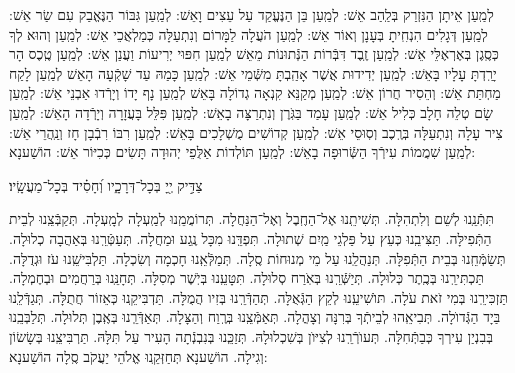 \documentclass[twoside, openany, parskip=half, 11pt]{book}
\begin{document}
לְמַֽעַן אֵיתָן הַנִּזְרַק בְּלַֽהַב אֵשׁ: לְמַֽעַן בֵּן הַנֶּעֱקַד עַל עֵצִים וָאֵשׁ: לְמַֽעַן גִּבּוֹר הַנֶּאֱבַק עִם שַׂר אֵשׁ: לְמַֽעַן דְּגָלִים הִנְחִֽיתָ בְּעָנָן וְאוֹר אֵשׁ: לְמַֽעַן הֹעֲלָה לַמָּרוֹם וְנִתְעַלָּה כְּמַלְאֲכֵי אֵשׁ: לְמַֽעַן וְהוּא לְךָ כְּסֶֽגֶן בְּאֶרְאֶלֵּי אֵשׁ: לְמַֽעַן זֶֽבֶד דִּבְּֿרוֹת הַנְּֿתוּנוֹת מֵאֵשׁ לְמַֽעַן חִפּוּי יְרִיעוֹת וַעֲנַן אֵשׁ: לְמַֽעַן טֶֽכֶס הָר יָרַֽדְתָּ עָלָיו בָּאֵשׁ: לְמַֽעַן יְדִידוּת אֲשֶׁר אָהַֽבְתָּ מִשְּֿׁמֵי אֵשׁ: לְמַֽעַן כָּמַהּ עַד שָׁקְֿעָה הָאֵשׁ לְמַֽעַן לָקַח מַחְתַּת אֵשׁ: וְהֵסִיר חֲרוֹן אֵשׁ: לְמַֽעַן מְקַנֵּא קִנְאָה גְדוֹלָה בָּאֵשׁ לְמַֽעַן נָף יָדוֹ וְיָרְֿדוּ אַבְנֵי אֵשׁ: לְמַֽעַן שָׂם טְלֵה חָלָב כְּלִיל אֵשׁ: לְמַֽעַן עָמַד בַּגֹּֽרֶן וְנִתְרַצָּה בָאֵשׁ: לְמַֽעַן פִּלֵּל בָּעֲזָרָה וְיָרְֿדָה הָאֵשׁ: לְמַֽעַן צִיר עָלָה וְנִתְעַלָּה בְּרֶֽכֶב וְסֽוּסֵי אֵשׁ: לְמַֽעַן קְדוֹשִׁים מֻשְׁלָכִים בָּאֵשׁ: לְמַֽעַן רִבּוֹ רִבְֿבָן חָז וְנַֽהֲרֵי אֵשׁ:
לְמַֽעַן שִׁמֲמוֹת עִירְֿךָ הַשְּֿׂרוּפָה בָאֵשׁ:
 לְמַֽעַן תּוֹלְדוֹת אַלֻּפֵי יְהוּדָה תָּשִׂים כְּכִיּוֹר אֵשׁ: הוֹשַׁענָא:
 
 צַדִּ֣יק יְ֖יָ בְּכָל־דְּרָכָ֑יו וְ֝חָסִ֗יד בְּכָל־מַעֲשָֽׂיו׃

תִּתְּֿנֵֽנוּ לְשֵׁם וְלִתְהִלָּה.
 תְּשִׁיתֵֽנוּ אֶל־הַחֶֽבֶל וְאֶל־הַנַּחֲלָה.
  תְּרוֹמֲמֵֽנוּ לְמַֽעְלָה לְמָֽעְלָה.
תְּקַבְּֿצֵֽנוּ לְבֵית הַתְּֿפִילָּה.
    תַּצִּיבֵֽנוּ כְּעֵץ עַל פַּלְגֵי מַֽיִם שְׁתוּלָה.
     תִּפְדֵּֽנוּ מִכָּל נֶֽגַע וּמַחֲלָה.
      תְּעַטְּֿרֵֽנוּ בְּאַהֲבָה כְלוּלָה.
       תְּשַׂמְּֿחֵֽנוּ בְּבֵית הַתְּֿפִלָּה.
        תְּנַהֲלֵֽנוּ עַל מֵי מְנוּחוֹת סֶֽלָה.
         תְּמַלְּֿאֵֽנוּ חָכְמָה וְשִׂכְלָה.
          תַּלְבִּישֵֽׁנוּ עֹז וּגְדֻלָּה.
           תַּכְתִּירֵֽנוּ בְּכֶֽתֶר כְּלוּלָה.
            תְּיַשְּֿׁרֵֽנוּ בְּאֹֽרַח סְלוּלָה.
             תִּטָּעֵֽנוּ בְּיֹֽשֶׁר מְסִלָּה.
              תְּחָנֵּֽנוּ בְּרַחֲמִים וּבְחֶמְלָה.
               תַּזְכִּירֵֽנוּ בְּמִי זֹאת עֹלָה.
תּוׂשִׁיעֵֽנוּ לְקֵץ הַגְּֿאֻלָּה.
                 תְּהַדְּֿרֵֽנוּ בְּזִיו הֲמֻלָּה.
תַּדְבִּיקֵֽנוּ כְּאֵזוֹר חֲתֻלָּה.
תְּגַדְּֿלֵֽנוּ בַּיָד הַגְּֿדוׂלָה.
 תְּבִיאֵֽהוּ לְבֵיתְֿךָ בְּרִנָּה וְצָהֳלָה.
                      תְּאַמְּֿצֵֽנוּ בְּרֶֽוַח וְהַצָּלָה.
תְּאַדְּֿרְֵנוּ בְּאֶֽבֶן תְּלוּלָה.
 תְּלַבְּבֵֽנוּ בְּבִנְיַן עִירְךָ כְּבַתְּֿחִלָּה.
תְּעוׂרְֿרֵֽנוּ לְצִיּוׂן בְּשִׁכְלוּלָהּ.
תְּזַכְֵּנוּ בְּנִבְנְֿתָה הָעִיר עַל תִּלָּהּ.
תַּרְבִּיצֵֽנוּ בְּשָׂשׂוֹן וְגִילָה.
                           הוֹשַׁענָא תְּחַזְּקֵֽנוּ אֱלֹהֵי יַעֲקֹב סֶֽלָה הוֹשַׁענָא:
\end{document}

